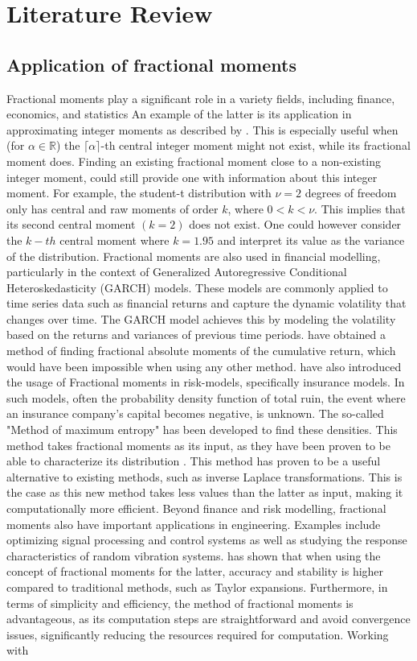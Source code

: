\section{Literature Review}
\subsection{Application of fractional moments}
Fractional moments play a significant role in a variety fields, including finance, economics, and statistics An example of the latter is its application in approximating integer moments as described by \cite{inverardi2024}. This is especially useful when (for \(\alpha \in \mathbb{R}\)) the \(\lceil\alpha \rceil\)-th central integer moment might not exist, while its fractional moment does. Finding an existing fractional moment close to a non-existing integer moment, could still provide one with information about this integer moment. For example, the student-t distribution with \(\nu = 2\) degrees of freedom only has central and raw moments of order \(k\), where \( 0 < k < \nu\). This implies that its second central moment \((k = 2)\) does not exist. One could however consider the \(k-th\) central moment where \(k = 1.95\) and interpret its value as the variance of the distribution. Fractional moments are also used in financial modelling, particularly in the context of Generalized Autoregressive Conditional Heteroskedasticity (GARCH) models. These models are commonly applied to time series data such as financial returns and capture the dynamic volatility that changes over time. The GARCH model achieves this by modeling the volatility based on the returns and variances of previous time periods. \cite{hansen2024} have obtained a method of finding fractional absolute moments of the cumulative return, which would have been impossible when using any other method. \cite{gyzl2013} have also introduced the usage of Fractional moments in risk-models, specifically insurance models. In such models, often the probability density function of total ruin, the event where an insurance company's capital becomes negative, is unknown. The so-called "Method of maximum entropy" has been developed to find these densities. This method takes fractional moments as its input, as they have been proven to be able to characterize its distribution \cite{lin1992}. This method has proven to be a useful alternative to existing methods, such as inverse Laplace transformations. This is the case as this new method takes less values than the latter as input, making it computationally more efficient. Beyond finance and risk modelling, fractional moments also have important applications in engineering. Examples include optimizing signal processing and control systems as well as studying the response characteristics of random vibration systems. \cite{wang2025} has shown that when using the concept of fractional moments for the latter, accuracy and stability is higher compared to traditional methods, such as Taylor expansions. Furthermore, in terms of simplicity and efficiency, the method of fractional moments is advantageous, as its computation steps are straightforward and avoid convergence issues, significantly reducing the resources required for computation. Working with 